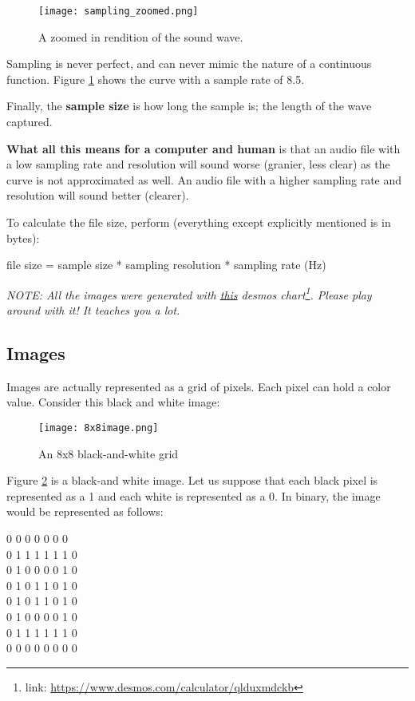 \documentclass[../main.tex]{subfiles}
\begin{document}
\begin{figure}[H]
    \centering
    \texttt{[image: sampling\_zoomed.png]}
    \caption{A zoomed in rendition of the sound wave.}
    \label{fig:sampling_zoomed}
\end{figure}

Sampling is never perfect, and can never mimic the nature of a continuous function. Figure \ref{fig:sampling_zoomed} shows the curve with a sample rate of 8.5.

Finally, the \textbf{sample size} is how long the sample is; the length of the wave captured.

\textbf{What all this means for a computer and human} is that an audio file with a low sampling rate and resolution will sound worse (granier, less clear) as the curve is not approximated as well. An audio file with a higher sampling rate and resolution will sound better (clearer).

To calculate the file size, perform (everything except explicitly mentioned is in bytes):

{\centering\ccmono
file size = sample size * sampling resolution * sampling rate (Hz)
}

\textit{NOTE: All the images were generated with \href{https://www.desmos.com/calculator/qlduxmdckb}{this} desmos chart\footnote{link: \url{https://www.desmos.com/calculator/qlduxmdckb}}. Please play around with it! It teaches you a lot.}

\newpage
\subsection{Images}

Images are actually represented as a grid of pixels. Each pixel can hold a color value. Consider this black and white image:

\begin{figure}[H]
    \centering
    \texttt{[image: 8x8image.png]}
    \caption{An 8x8 black-and-white grid}
    \label{fig:8x8image}
\end{figure}

Figure \ref{fig:8x8image} is a black-and white image. Let us suppose that each black pixel is represented as a 1 and each white is represented as a 0. In binary, the image would be represented as follows:

\medskip

{\ccmono{} 0 0 0 0 0 0 0\\
    0 1 1 1 1 1 1 0\\
    0 1 0 0 0 0 1 0\\
    0 1 0 1 1 0 1 0\\
    0 1 0 1 1 0 1 0\\
    0 1 0 0 0 0 1 0\\
    0 1 1 1 1 1 1 0\\
    0 0 0 0 0 0 0 0\\
}
\end{document}

